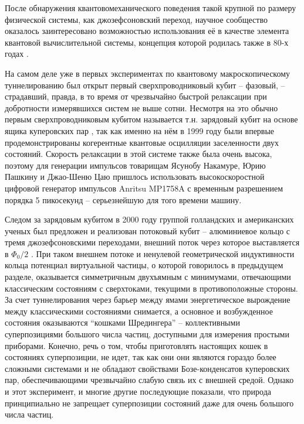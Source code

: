 \documentclass[14pt, a4paper]{extreport}
\numberwithin{equation}{section}
\begin{document}
После обнаружения квантовомеханического поведения такой крупной по размеру физической системы, как джозефсоновский переход, научное сообщество оказалось заинтересовано возможностью использования её в качестве элемента квантовой вычислительной системы, концепция которой родилась также в 80-х годах \cite{manin1980, feynman1982simulating}. 

На самом деле уже в первых экспериментах по квантовому макроскопическому туннелированию был открыт первый сверхпроводниковый кубит -- фазовый, -- страдавший, правда, в то время от чрезвычайно быстрой релаксации при добротности измерявшихся систем не выше сотни. Несмотря на это обычно первым сверхпроводниковым кубитом называется т.н. зарядовый кубит на основе ящика куперовских пар \cite{nakamura1999coherent}, так как именно на нём в 1999 году были впервые продемонстрированы когерентные квантовые осцилляции заселенности двух состояний. Скорость релаксации в этой системе также была очень высока, поэтому для генерации импульсов товарищам Ясунобу Накамуре, Юрию Пашкину и Джао-Шеню Цаю пришлось использовать высокоскоростной цифровой генератор импульсов Anritsu MP1758A с временным разрешением порядка 5 пикосекунд -- серьезнейшую для того времени машину. 

Следом за зарядовым кубитом в 2000 году группой голландских и американских ученых был предложен и реализован потоковый кубит -- алюминиевое кольцо с тремя джозефсоновскими переходами, внешний поток через которое выставляется в $ \Phi_0/2 $ \cite{van2000quantum}. При таком внешнем потоке и ненулевой геометрической индуктивности кольца потенциал виртуальной частицы, о которой говорилось в предыдущем разделе, оказывается симметричным двухъямным с минимумами, отвечающими классическим состояниям с сверхтоками, текущими в противоположные стороны. За счет туннелирования через барьер между ямами энергетическое вырождение между классическими состояниями снимается, а основное и возбужденное состояния оказываются  ``кошками Шредингера'' -- коллективными суперпозициями большого числа частиц, доступными для измерения простыми приборами. Конечно, речь о том, чтобы приготовлять настоящих кошек в состояниях суперпозиции, не идет, так как они они являются гораздо более сложными системами и не обладают свойствами Бозе-конденсатов куперовских пар, обеспечивающими чрезвычайно слабую связь их с внешней средой. Однако и этот эксперимент, и многие другие последующие показали, что природа принципиально не запрещает суперпозиции состояний даже для очень большого числа частиц.
\end{document}
